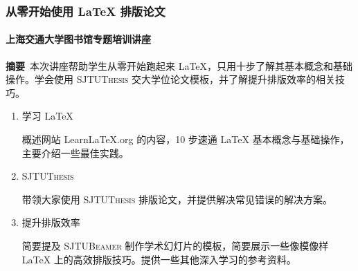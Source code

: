 \documentclass[UTF8]{ctexbeamer}
\begin{document}
    \begin{frame}
        \frametitle{从零开始使用 \LaTeX{} 排版论文}
        \framesubtitle{上海交通大学图书馆专题培训讲座}

        {\scriptsize \textbf{摘要}~本次讲座帮助学生从零开始跑起来 \LaTeX{}，只用十步了解其基本概念和基础操作。学会使用 \textsc{SJTUThesis} 交大学位论文模板，并了解提升排版效率的相关技巧。\par}

        \begin{enumerate}
            \item 学习 \LaTeX{}
            
            {\scriptsize 概述网站 Learn\LaTeX{}.org 的内容，10 步速通 \LaTeX{} 基本概念与基础操作，主要介绍一些最佳实践。 \par}
            \item \textsc{SJTUThesis}
            
            {\scriptsize 带领大家使用 \textsc{SJTUThesis} 排版论文，并提供解决常见错误的解决方案。 \par}
            
            \item 提升排版效率
            
            {\scriptsize 简要提及 \textsc{SJTUBeamer} 制作学术幻灯片的模板，简要展示一些像模像样 \LaTeX{} 上的高效排版技巧。提供一些其他深入学习的参考资料。\par}
        \end{enumerate}
    \end{frame}
\end{document}
